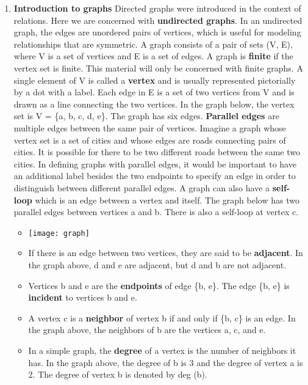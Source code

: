 \documentclass[12pt,a4paper]{article}
\begin{document}
\clearpage
\begin{center}
  \large\textsc{}
\end{center}
\begin{enumerate}
  \item \textbf{Introduction to graphs} Directed graphs were introduced in the context of relations. Here we are concerned with \textbf{undirected graphs}. In an undirected graph, the edges are unordered pairs of vertices, which is useful for modeling relationships that are symmetric.
  A graph consists of a pair of sets (V, E), where V is a set of vertices and E is a set of edges. A graph is \textbf{finite} if the vertex set is finite. This material will only be concerned with finite graphs. A single element of V is called a \textbf{vertex} and is usually represented pictorially by a dot with a label. Each edge in E is a set of two vertices from V and is drawn as a line connecting the two vertices. In the graph below, the vertex set is V = \{a, b, c, d, e\}. The graph has six edges.
  \textbf{Parallel edges} are multiple edges between the same pair of vertices. Imagine a graph whose vertex set is a set of cities and whose edges are roads connecting pairs of cities. It is possible for there to be two different roads between the same two cities. In defining graphs with parallel edges, it would be important to have an additional label besides the two endpoints to specify an edge in order to distinguish between different parallel edges. A graph can also have a \textbf{self-loop} which is an edge between a vertex and itself. The graph below has two parallel edges between vertices a and b. There is also a self-loop at vertex c.
  \begin{itemize}
    \item[] \texttt{[image: graph]}
    \item If there is an edge between two vertices, they are said to be \textbf{adjacent}. In the graph above, d and e are adjacent, but d and b are not adjacent.
    \item Vertices b and e are the \textbf{endpoints} of edge \{b, e\}. The edge \{b, e\} is \textbf{incident} to vertices b and e.
    \item A vertex c is a \textbf{neighbor} of vertex b if and only if \{b, c\} is an edge. In the graph above, the neighbors of b are the vertices a, c, and e.
    \item In a simple graph, the \textbf{degree} of a vertex is the number of neighbors it has. In the graph above, the degree of b is 3 and the degree of vertex a is 2. The degree of vertex b is denoted by deg (b).

\end{itemize}
\end{enumerate}
\end{document}
